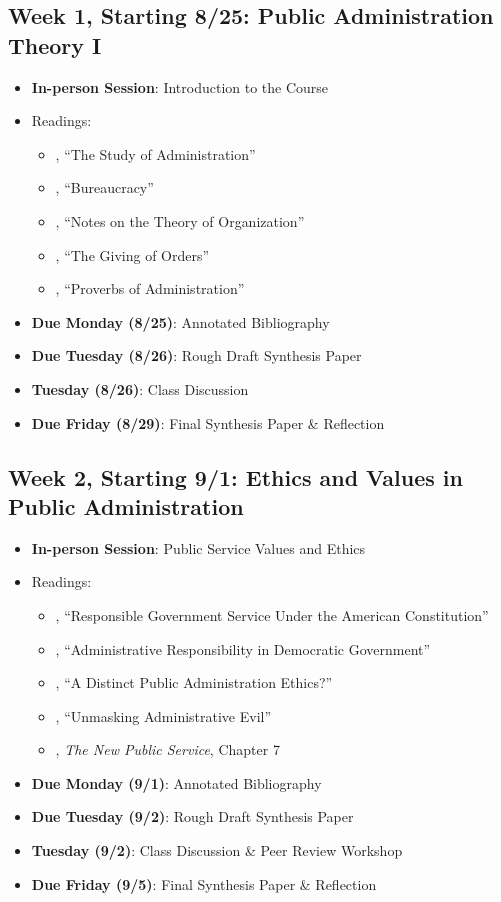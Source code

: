 \documentclass[12pt, letterpaper]{article}
\begin{document}
\subsection*{Week 1, Starting 8/25: Public Administration Theory I}
\begin{itemize}
    \item \textbf{In-person Session}: Introduction to the Course
    \item Readings:
        \begin{itemize}
            \item \citet{WILSON1887a}, ``The Study of Administration''
            \item \citet{Weber1946}, ``Bureaucracy'' 
            \item \citet{gulick1937}, ``Notes on the Theory of Organization'' 
            \item \citet{Follett1926}, ``The Giving of Orders'' 
            \item \citet{simon1946}, ``Proverbs of Administration'' 
        \end{itemize}
    \item \textbf{Due Monday (8/25)}: Annotated Bibliography
    \item \textbf{Due Tuesday (8/26)}: Rough Draft Synthesis Paper
    \item \textbf{Tuesday (8/26)}: Class Discussion
    \item \textbf{Due Friday (8/29)}: Final Synthesis Paper \& Reflection
\end{itemize}

\subsection*{Week 2, Starting 9/1: Ethics and Values in Public Administration}
\begin{itemize}
    \item \textbf{In-person Session}: Public Service Values and Ethics
    \item Readings:
        \begin{itemize}
            \item \citet{friedrich1935}, ``Responsible Government Service Under the American Constitution'' 
            \item \citet{FINER1941}, ``Administrative Responsibility in Democratic Government'' 
            \item \citet{goss1996}, ``A Distinct Public Administration Ethics?'' 
            \item \citet{Adams2009}, ``Unmasking Administrative Evil'' 
            \item \citet{Denhardt2015}, \emph{The New Public Service}, Chapter 7 
        \end{itemize}
    \item \textbf{Due Monday (9/1)}: Annotated Bibliography
    \item \textbf{Due Tuesday (9/2)}: Rough Draft Synthesis Paper
    \item \textbf{Tuesday (9/2)}: Class Discussion  \& Peer Review Workshop
    \item \textbf{Due Friday (9/5)}: Final Synthesis Paper \& Reflection
\end{itemize}
\end{document}
